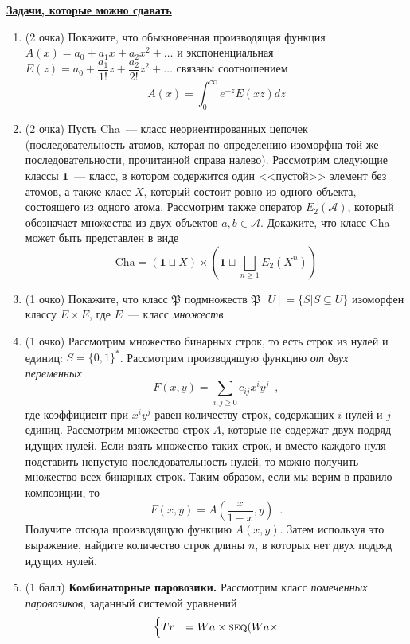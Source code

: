 \documentclass{article}
\theoremstyle{definition}
\begin{document}
\begin{center}
	{\large\underline{\textbf{Задачи, которые можно сдавать}}}
\end{center}
\begin{enumerate}
\item(2 очка) Покажите, что обыкновенная производящая функция \( A(x) = a_0 + 
a_1 x + a_2 x^2 + \ldots \) и экспоненциальная \( E(z) = a_0 + \dfrac{a_1}{1!}z 
+ \dfrac{a_2}{2!}z^2 + \ldots \) связаны соотношением
\[
	A(x) = \int_{0}^{\infty} e^{-z} E(xz) dz
\]
\item(2 очка) Пусть Cha~--- класс неориентированных 
цепочек (последовательность атомов, которая по определению изоморфна той же 
последовательности, прочитанной справа налево). Рассмотрим следующие классы \( 
\mathbf{1} 
\)~--- класс, в котором содержится один <<пустой>> элемент без атомов, а также 
класс \( X \), который состоит ровно из одного объекта, состоящего из одного 
атома. Рассмотрим также
оператор \( E_2(\mathcal A) \), который обозначает множества из двух объектов 
\( a, b \in \mathcal A \). Докажите, что класс Cha может быть представлен в виде
\[
	\mathrm{Cha} = (\mathbf{1} \sqcup X) \times \left(\mathbf{1} \sqcup 
	\bigsqcup_{n \geq 1} 
	E_2(X^n)\right)
\]
\item(1 очко) Покажите, что класс \( \mathfrak P \) подмножеств \( \mathfrak 
P[U] = \{ S | S \subseteq U \} \) изоморфен классу \( E \times E \), где \( E 
\)~--- класс \textit{множеств}.
\item(1 очко) Рассмотрим множество бинарных строк, то есть строк из нулей и 
единиц: \( S = \{0, 1\}^{\ast} \). Рассмотрим производящую функцию \textit{от 
двух переменных}
\[
	F(x, y) = \sum_{i, j \geq 0} c_{ij} x^i y^j \enspace ,
\]
где коэффициент при \( x^i y^j \) равен количеству строк, содержащих \( i \) 
нулей и \( j \) единиц. Рассмотрим множество строк \( A \), которые не содержат 
двух подряд идущих нулей. Если взять множество таких строк, и вместо каждого 
нуля подставить непустую последовательность нулей, то можно получить множество 
всех бинарных строк. Таким образом, если мы верим в правило композиции, то
\[
	F(x, y) = A\left(\dfrac{x}{1-x}, y\right ) \enspace .
\]
Получите отсюда производящую функцию \( A(x, y) \). Затем используя это 
выражение, найдите количество строк длины \( n \), в которых нет двух подряд 
идущих нулей.
\item(1 балл) \textbf{Комбинаторные паровозики.} Рассмотрим класс 
\textit{помеченных паровозиков}, заданный системой уравнений
\[
	\begin{cases}
		Tr & =  Wa \times \text{\textsc{seq}}(Wa \times 

\end{cases}\]
\end{enumerate}
\end{document}
